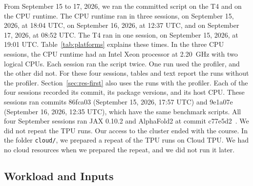 From September 15 to 17, 2026, we ran the committed script on the T4 and on the CPU runtime. %
The CPU runtime ran in three sessions, on September 15, 2026, at 18:04 UTC, on September 16, 2026, at 12:37 UTC, and on September 17, 2026, at 08:52 UTC. %
The T4 ran in one session, on September 15, 2026, at 19:01 UTC. Table~\ref{tab:platforms} explains these times. %
In the three CPU sessions, the CPU runtime had an Intel Xeon processor at 2.20~GHz with two logical CPUs. %
Each session ran the script twice. One run used the profiler, and the other did not. For these four sessions, tables
and text report the runs without the profiler. Section~\ref{sec:res-first} also uses the runs with the profiler. Each
of the four sessions recorded its commit, its package versions, and its host CPU.
These sessions ran commits 86fca03 (September 15, 2026, 17:57 UTC) and 9e1a07e (September 16, 2026, 12:35 UTC), which have the same benchmark scripts. %
All four September sessions ran JAX 0.10.2 and AlphaFold2 at commit c77e5d2~\cite{alphafoldrepo}. %
We did not repeat the TPU runs. Our access to the cluster ended with the course.
In the folder \texttt{cloud/}, we prepared a repeat of the TPU runs on Cloud TPU. We had no cloud resources when we
prepared the repeat, and we did not run it later.

\subsection{Workload and Inputs}\label{sec:workload}
\begin{table}[t]
\caption{\capTabExperiments}\label{tab:experiments}
\centering\small\setlength{\tabcolsep}{3.5pt}
\end{table}

